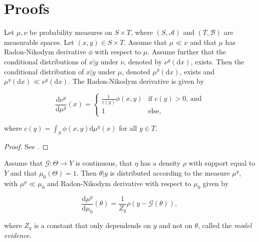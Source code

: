 \section{Proofs}


\begin{theorem}
  \label{duley}
  Let $\mu, \nu$ be probability measures on $S \times T$, where $(S, \mathcal{A})$ and $(T, \mathcal{B})$ are measurable spaces. Let $(x, y) \in S \times T$. Assume that $\mu \ll \nu$ and that $\mu$ has Radon-Nikodym derivative $\phi$ with respect to $\mu$. Assume further that the conditional distributions of $x|y$ under $\nu$, denoted by $\nu^y(\text{d}x)$, exists. Then the conditional distribution of $x|y$ under $\mu$, denoted $\mu^y(\text{d}x)$, exists and $\mu^y(\text{d}x) \ll \nu^y(\text{d}x)$. The Radon-Nikodym derivative is given by

  \begin{equation}
    \frac{\text{d}\nu^y}{\text{d}\mu^y}(x) =  \begin{cases}
      \frac1{c(y)}\phi(x,y) & \text{if $c(y) > 0$, and}\\
      1 & \text{else,}
    \end{cases}  
  \end{equation}

  where $c(y) = \int_{S}\phi(x,y)\text{d}\mu^y(x)$ for all $y \in T$.
\end{theorem}

\begin{proof}
  See \cite{dudley_2002}.
\end{proof}

\begin{theorem}
  Assume that $\mathcal{G} : \Theta \rightarrow Y$ is continuous, that $\eta$ has a density $\rho$ with support equal to $Y$ and that $\mu_0(\Theta) = 1$. Then $\theta | y$ is distributed according to the measure $\mu^y$, with $\mu^y \ll \mu_0$ and Radon-Nikodym derivative with respect to $\mu_0$ given by

  \begin{equation}
    \frac{\text{d}\mu^y}{\text{d}\mu_0}(\theta) = \frac1{Z_y}\rho(y - \mathcal{G}(\theta)),
  \end{equation}

  where $Z_y$ is a constant that only dependends on $y$ and not on $\theta$, called the \textit{model evidence}.
\end{theorem}

